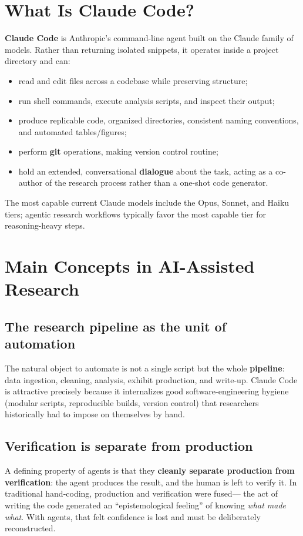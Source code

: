 \documentclass[11pt]{article}
\newcommand{\concept}[1]{\textbf{#1}}
\begin{document}
\section{What Is Claude Code?}
\concept{Claude Code} is Anthropic's command-line agent built on the Claude
family of models. Rather than returning isolated snippets, it operates inside a
project directory and can:
\begin{itemize}[leftmargin=1.4em,itemsep=2pt]
  \item read and edit files across a codebase while preserving structure;
  \item run shell commands, execute analysis scripts, and inspect their output;
  \item produce replicable code, organized directories, consistent naming
        conventions, and automated tables/figures;
  \item perform \concept{git} operations, making version control routine;
  \item hold an extended, conversational \concept{dialogue} about the task,
        acting as a co-author of the research process rather than a one-shot
        code generator.
\end{itemize}
The most capable current Claude models include the Opus, Sonnet, and Haiku
tiers; agentic research workflows typically favor the most capable tier for
reasoning-heavy steps.

\section{Main Concepts in AI-Assisted Research}

\subsection{The research pipeline as the unit of automation}
The natural object to automate is not a single script but the whole
\concept{pipeline}: data ingestion, cleaning, analysis, exhibit production, and
write-up. Claude Code is attractive precisely because it internalizes good
software-engineering hygiene (modular scripts, reproducible builds, version
control) that researchers historically had to impose on themselves by hand.

\subsection{Verification is separate from production}
A defining property of agents is that they \concept{cleanly separate production
from verification}: the agent produces the result, and the human is left to
verify it. In traditional hand-coding, production and verification were fused---
the act of writing the code generated an ``epistemological feeling'' of knowing
\emph{what made what}. With agents, that felt confidence is lost and must be
deliberately reconstructed.
\end{document}
